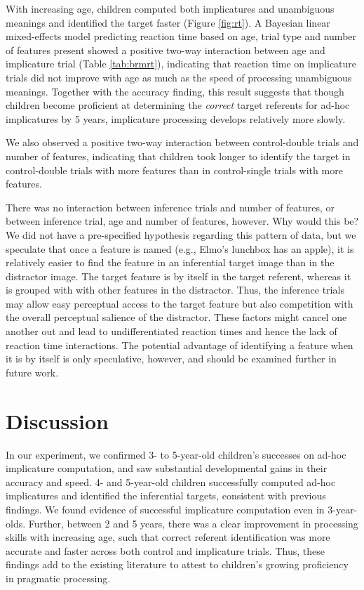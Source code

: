 \documentclass[man]{apa6}
\theoremstyle{definition}
\theoremstyle{definition}
\theoremstyle{definition}
\theoremstyle{remark}
\begin{document}
With increasing age, children computed both implicatures and unambiguous
meanings and identified the target faster (Figure \ref{fig:rt}). A
Bayesian linear mixed-effects model predicting reaction time based on
age, trial type and number of features present showed a positive two-way
interaction between age and implicature trial (Table \ref{tab:brmrt}),
indicating that reaction time on implicature trials did not improve with
age as much as the speed of processing unambiguous meanings. Together
with the accuracy finding, this result suggests that though children
become proficient at determining the \emph{correct} target referents for
ad-hoc implicatures by 5 years, implicature processing develops
relatively more slowly.

We also observed a positive two-way interaction between control-double
trials and number of features, indicating that children took longer to
identify the target in control-double trials with more features than in
control-single trials with more features.

There was no interaction between inference trials and number of
features, or between inference trial, age and number of features,
however. Why would this be? We did not have a pre-specified hypothesis
regarding this pattern of data, but we speculate that once a feature is
named (e.g., Elmo's lunchbox has an apple), it is relatively easier to
find the feature in an inferential target image than in the distractor
image. The target feature is by itself in the target referent, whereas
it is grouped with with other features in the distractor. Thus, the
inference trials may allow easy perceptual access to the target feature
but also competition with the overall perceptual salience of the
distractor. These factors might cancel one another out and lead to
undifferentiated reaction times and hence the lack of reaction time
interactions. The potential advantage of identifying a feature when it
is by itself is only speculative, however, and should be examined
further in future work.

\section{Discussion}\label{discussion}

In our experiment, we confirmed 3- to 5-year-old children's successes on
ad-hoc implicature computation, and saw substantial developmental gains
in their accuracy and speed. 4- and 5-year-old children successfully
computed ad-hoc implicatures and identified the inferential targets,
consistent with previous findings. We found evidence of successful
implicature computation even in 3-year-olds. Further, between 2 and 5
years, there was a clear improvement in processing skills with
increasing age, such that correct referent identification was more
accurate and faster across both control and implicature trials. Thus,
these findings add to the existing literature to attest to children's
growing proficiency in pragmatic processing.
\end{document}
